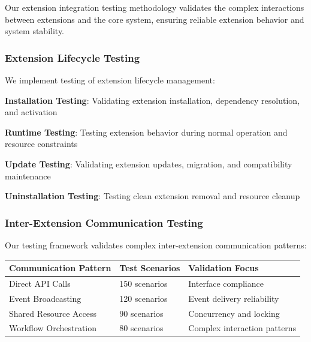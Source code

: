 Our extension integration testing methodology validates the complex interactions between extensions and the core system, ensuring reliable extension behavior and system stability.

\subsubsection*{Extension Lifecycle Testing}

We implement testing of extension lifecycle management:

\begin{expandedlist}
    \item \textbf{Installation Testing}: Validating extension installation, dependency resolution, and activation
    \item \textbf{Runtime Testing}: Testing extension behavior during normal operation and resource constraints
    \item \textbf{Update Testing}: Validating extension updates, migration, and compatibility maintenance
    \item \textbf{Uninstallation Testing}: Testing clean extension removal and resource cleanup
\end{expandedlist}

\subsubsection*{Inter-Extension Communication Testing}

Our testing framework validates complex inter-extension communication patterns:

\begin{center}
\begin{tabular}{@{}lll@{}}
\toprule
\textbf{Communication Pattern} & \textbf{Test Scenarios} & \textbf{Validation Focus} \\
\midrule
Direct API Calls & 150 scenarios & Interface compliance \\
Event Broadcasting & 120 scenarios & Event delivery reliability \\
Shared Resource Access & 90 scenarios & Concurrency and locking \\
Workflow Orchestration & 80 scenarios & Complex interaction patterns \\
\bottomrule
\end{tabular}
\end{center}

